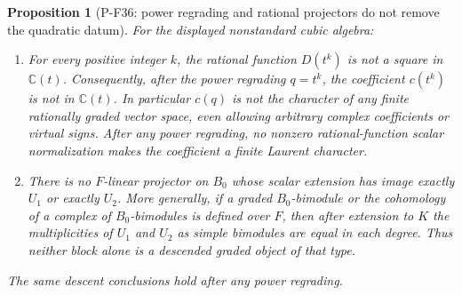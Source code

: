 \documentclass[11pt,a4paper]{article}
\newtheorem{proposition}{Proposition}[section]
\begin{document}
\begin{proposition}[P-F36: power regrading and rational projectors do not remove the quadratic datum]
\label{prop:nonstandarddescent}
For the displayed nonstandard cubic algebra:
\begin{enumerate}
\item For every positive integer $k$, the rational function $D(t^k)$
is not a square in $\mathbb C(t)$. Consequently, after the power
regrading $q=t^k$, the coefficient $c(t^k)$ is not in
$\mathbb C(t)$. In particular $c(q)$ is not the character of any
finite rationally graded vector space, even allowing arbitrary
complex coefficients or virtual signs. After any power regrading,
no nonzero rational-function scalar normalization makes the
coefficient a finite Laurent character.
\item There is no $F$-linear projector on $B_0$ whose scalar
extension has image exactly $U_1$ or exactly $U_2$. More generally,
if a graded $B_0$-bimodule or the cohomology of a complex of
$B_0$-bimodules is defined over $F$, then after extension to $K$
the multiplicities of $U_1$ and $U_2$ as simple bimodules are equal
in each degree. Thus neither block alone is a descended graded
object of that type.
\end{enumerate}
The same descent conclusions hold after any power regrading.
\end{proposition}
\end{document}
